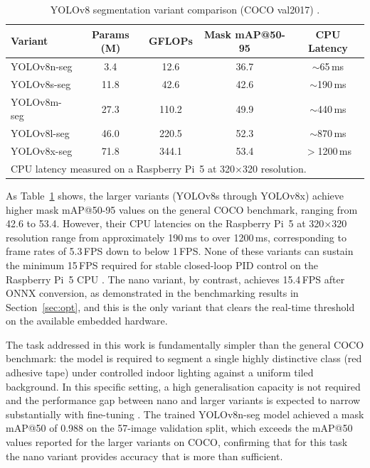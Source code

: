 \begin{table}[tbp]
  \centering
  \caption{YOLOv8 segmentation variant comparison (COCO val2017) \cite{r32}.}
  \label{tab:yolov8compare}
  \begin{tabular}{lcccc}
    \toprule
    Variant        & Params (M) & GFLOPs & Mask mAP@50-95 & CPU Latency \\
    \midrule
    YOLOv8n-seg    & 3.4        & 12.6   & 36.7           & $\sim$65\,ms \\
    YOLOv8s-seg    & 11.8       & 42.6   & 42.6           & $\sim$190\,ms \\
    YOLOv8m-seg    & 27.3       & 110.2  & 49.9           & $\sim$440\,ms \\
    YOLOv8l-seg    & 46.0       & 220.5  & 52.3           & $\sim$870\,ms \\
    YOLOv8x-seg    & 71.8       & 344.1  & 53.4           & $>$1200\,ms  \\
    \bottomrule
    \multicolumn{5}{l}{\small CPU latency measured on a Raspberry Pi~5 at 320$\times$320 resolution.}
  \end{tabular}
\end{table}

As Table~\ref{tab:yolov8compare} shows, the larger variants (YOLOv8s
through YOLOv8x) achieve higher mask mAP@50-95 values on the
general COCO benchmark, ranging from 42.6 to 53.4. However, their
CPU latencies on the Raspberry Pi~5 at 320$\times$320 resolution
range from approximately 190\,ms to over 1200\,ms, corresponding to
frame rates of 5.3\,FPS down to below 1\,FPS. None of these variants
can sustain the minimum 15\,FPS required for stable closed-loop PID
control on the Raspberry Pi~5 CPU \cite{r34,r29}. The nano variant,
by contrast, achieves 15.4\,FPS after ONNX conversion, as demonstrated
in the benchmarking results in Section~\ref{sec:opt}, and this is the
only variant that clears the real-time threshold on the available
embedded hardware.

The task addressed in this work is fundamentally simpler than the
general COCO benchmark: the model is required to segment a single
highly distinctive class (red adhesive tape) under controlled
indoor lighting against a uniform tiled background. In this specific
setting, a high generalisation capacity is not required and the
performance gap between nano and larger variants is expected to
narrow substantially with fine-tuning \cite{r30,r32}. The trained
YOLOv8n-seg model achieved a mask mAP@50 of 0.988 on the
57-image validation split, which exceeds the mAP@50 values reported
for the larger variants on COCO, confirming that for this task
the nano variant provides accuracy that is more than sufficient.

